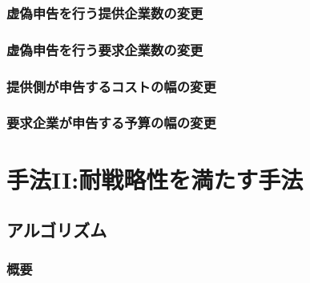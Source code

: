 \hypertarget{ux865aux507dux7533ux544aux3092ux884cux3046ux63d0ux4f9bux4f01ux696dux6570ux306eux5909ux66f4}{%
\subsection{虚偽申告を行う提供企業数の変更}\label{ux865aux507dux7533ux544aux3092ux884cux3046ux63d0ux4f9bux4f01ux696dux6570ux306eux5909ux66f4}}

\hypertarget{ux865aux507dux7533ux544aux3092ux884cux3046ux8981ux6c42ux4f01ux696dux6570ux306eux5909ux66f4}{%
\subsection{虚偽申告を行う要求企業数の変更}\label{ux865aux507dux7533ux544aux3092ux884cux3046ux8981ux6c42ux4f01ux696dux6570ux306eux5909ux66f4}}

\hypertarget{ux63d0ux4f9bux5074ux304cux7533ux544aux3059ux308bux30b3ux30b9ux30c8ux306eux5e45ux306eux5909ux66f4}{%
\subsection{提供側が申告するコストの幅の変更}\label{ux63d0ux4f9bux5074ux304cux7533ux544aux3059ux308bux30b3ux30b9ux30c8ux306eux5e45ux306eux5909ux66f4}}

\hypertarget{ux8981ux6c42ux4f01ux696dux304cux7533ux544aux3059ux308bux4e88ux7b97ux306eux5e45ux306eux5909ux66f4}{%
\subsection{要求企業が申告する予算の幅の変更}\label{ux8981ux6c42ux4f01ux696dux304cux7533ux544aux3059ux308bux4e88ux7b97ux306eux5e45ux306eux5909ux66f4}}

\hypertarget{ux624bux6cd5iiux8010ux6226ux7565ux6027ux3092ux6e80ux305fux3059ux624bux6cd5}{%
\chapter{手法II:耐戦略性を満たす手法}\label{ux624bux6cd5iiux8010ux6226ux7565ux6027ux3092ux6e80ux305fux3059ux624bux6cd5}}

\hypertarget{ux30a2ux30ebux30b4ux30eaux30baux30e0-1}{%
\section{アルゴリズム}\label{ux30a2ux30ebux30b4ux30eaux30baux30e0-1}}

\hypertarget{ux6982ux8981-1}{%
\subsection{概要}\label{ux6982ux8981-1}}

